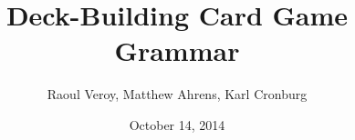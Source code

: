 \documentclass{article}
\title{Deck-Building Card Game Grammar}
\author{Raoul Veroy, Matthew Ahrens, Karl Cronburg}
\date{October 14, 2014}
\begin{document}
\maketitle
\thispagestyle{empty}

\begin{grammar}

\end{grammar}
\end{document}
